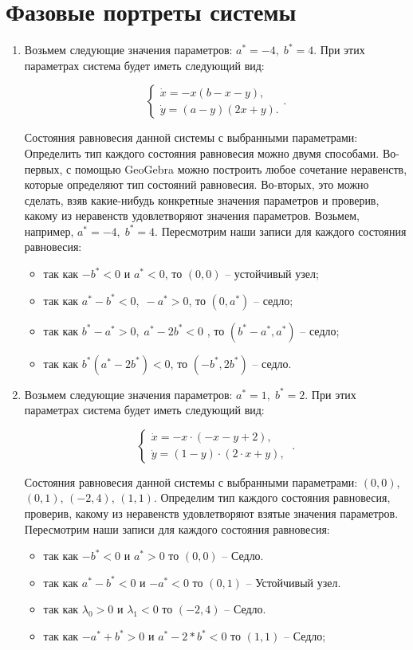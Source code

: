 \section{Фазовые портреты системы}
\begin{enumerate} 
\item 
Возьмем следующие значения параметров:  $a^\ast = -4,\; b^\ast = 4$. При этих параметрах система будет иметь следующий вид:

$$ 
\left \lbrace 
\begin{matrix}
\dot{x} = -x(b-x-y), \\
\dot{y} = (a-y)(2x+y).
\end{matrix} 
\right . .$$

Состояния равновесия данной системы с выбранными параметрами: 
Определить тип каждого состояния равновесия можно двумя способами.
Во-первых, с помощью GeoGebra можно построить любое сочетание неравенств, которые определяют тип состояний равновесия.
Во-вторых, это можно сделать, взяв какие-нибудь конкретные значения параметров и проверив, какому из неравенств удовлетворяют значения параметров. 
Возьмем, например, $a^\ast = -4,\; b^\ast = 4$. 
Пересмотрим наши записи для каждого состояния равновесия: 
\begin{itemize}
\item{так как $-b^\ast < 0$ и $a^\ast < 0$, то $(0, 0)$ -- устойчивый узел;}
\item{так как $a^\ast -b^\ast < 0, \; -a^\ast > 0$, то $(0, a^\ast)$ -- седло; }
\item{так как $b^\ast-a^\ast > 0, \; a^\ast - 2b^\ast < 0$ , то $\left ( b^\ast-a^\ast , a^\ast \right )$ -- седло;}
\item{так как $b^\ast(a^\ast - 2 b^\ast) < 0$, то $  ( -b^\ast, 2b^\ast ) $ -- седло.}
\end{itemize}

\item
Возьмем следующие значения параметров:  $a^\ast = 1,\; b^\ast = 2$. При этих параметрах система будет иметь следующий вид: 

$$
\left \lbrace 
\begin{matrix} 
\dot{x} = -x \cdot (-x - y + 2), \\
\dot{y} = (1 - y) \cdot (2 \cdot x + y), \
\end{matrix} 
\right . .$$

Состояния равновесия данной системы с выбранными параметрами: $(0, 0)$, $(0, 1)$, $(-2, 4)$, $(1, 1)$. Определим тип каждого состояния равновесия, проверив, какому из неравенств удовлетворяют взятые значения параметров.  Пересмотрим наши записи для каждого состояния равновесия: 
\begin{itemize}
\item{ так как $-b^\ast  < 0 $ и $a^\ast > 0 $ то $(0, 0)$ -- Седло.}
\item{ так как $a^\ast - b^\ast  < 0 $ и $-a^\ast  < 0 $ то $(0, 1)$ -- Устойчивый узел.}
\item{ так как ${\lambda_{0}} > 0 $ и ${\lambda_{1}}  < 0 $ то $(-2, 4)$ -- Седло.}
\item{ так как $-a^\ast + b^\ast > 0 $ и $a^\ast - 2*b^\ast  < 0 $ то $(1, 1)$ -- Седло;}
\end{itemize} 


\end{enumerate}
